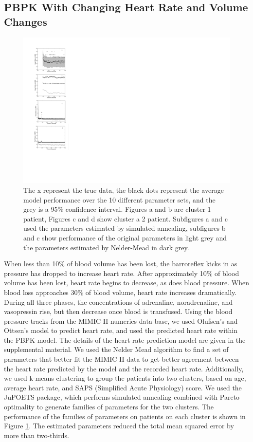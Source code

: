 \documentclass[12pt]{article}
\begin{document}
\subsection*{PBPK With Changing Heart Rate and Volume Changes}
  \begin{figure}
        \includegraphics[width=.325\textwidth,trim = {6cm 17cm 94cm 5cm},clip]{figures/OOmodelincol}     
       \caption{\scriptsize The x represent the true data, the black dots represent the average model performance over the 10 different parameter sets, and the grey is a 95\% confidence interval. Figures a and b are cluster 1 patient, Figures c and d show cluster a 2 patient. Subfigures a and c used the parameters estimated by simulated annealing, subfigures b and c show performance of the original parameters in light grey and the parameters estimated by Nelder-Mead in dark grey.}   
       \label{fig:mulitobjperformance}
\end{figure}
When less than 10\% of blood volume has been lost, the barroreflex kicks in as pressure has dropped to increase heart rate. \cite{foex1999systemic} After approximately 10\% of blood volume has been lost, heart rate begins to decrease, as does blood pressure. When blood loss approaches 30\% of blood volume, heart rate increases dramatically.\cite{jacobsen1990cardiovascular} During all three phases, the concentrations of adrenaline, noradrenaline, and vasopressin rise, but then decrease once blood is transfused.
Using the blood pressure tracks from the MIMIC II numerics data base, we used Olufsen's and Ottsen's model to predict heart rate, and used the predicted heart rate within the PBPK model. \cite{olufsen2013practical} The details of the heart rate prediction model are given in the supplemental material.
 We used the Nelder Mead algorithm to find a set of parameters that better fit the MIMIC II data to get better agreement between the heart rate predicted by the model and the recorded heart rate. Additionally, we used k-means clustering to group the patients into two clusters, based on age, average heart rate, and SAPS (Simplified Acute Physiology) score. We used the JuPOETS package, which performs simulated annealing combined with Pareto optimality to generate families of parameters for the two clusters. \cite{bassen2016jupoets} The performance of the families of parameters on patients on each cluster is shown in Figure \ref{fig:mulitobjperformance}. The estimated parameters reduced the total mean squared error by more than two-thirds. 
 
\end{document}
